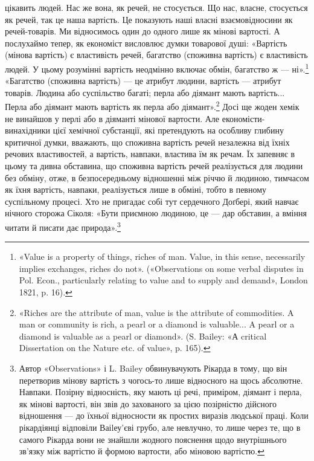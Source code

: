\parcont{}  %
цікавить людей. Нас же вона, як речей, не стосується. Що нас,
власне, стосується як речей, так це наша вартість. Це показують
наші власні взаємовідносини як речей-товарів. Ми відносимось
один до одного лише як мінові вартості. А послухаймо
тепер, як економіст висловлює думки товарової душі: «Вартість
(мінова вартість) є властивість речей, багатство (споживна вартість)
є властивість людей. У цьому розумінні вартість неодмінно
включає обмін, багатство ж — ні».\footnote{
«Value is a property of things, riches of man. Value, in this sense,
necessarily implies exchanges, riches do not». («Observations on some verbal
disputes in Pol. Econ., particularly relating to value and to supply and
demand», London 1821, p. 16).
} «Багатство (споживна вартість) —
це атрибут людини, вартість — атрибут товарів. Людина
або суспільство багаті; перла або діямант мають вартість...
Перла або діямант мають вартість як перла або діямант».\footnote{
«Riches are the attribute of man, value is the attribute of commodities.
A man or community is rich, a pearl or a diamond is valuable...
A pearl or a diamond is valuable as a pearl or diamond». (S. Bailey:
«А critical Dissertation on the Nature etc. of value», p. 165).
}
Досі ще жоден хемік не винайшов у перлі або в діяманті мінової
вартости. Але економісти-винахідники цієї хемічної субстанції,
які претендують на особливу глибину критичної думки, вважають,
що споживна вартість речей незалежна від їхніх речових властивостей,
а вартість, навпаки, властива їм як речам. Їх запевняє
в цьому та дивна обставина, що споживна вартість речей реалізується
для людини без обміну, отже, в безпосередньому відношенні
між річчю й людиною, тимчасом як їхня вартість, навпаки,
реалізується лише в обміні, тобто в певному суспільному процесі.
Хто не пригадає собі тут сердечного Доґбері, який навчає нічного
сторожа Сіколя: «Бути приємною людиною, це — дар обставин,
а вміння читати й писати дає природа».\footnote{
Автор «Observations» і L. Bailey обвинувачують Рікарда в тому,
що він перетворив мінову вартість з чогось-то лише відносного на щось
абсолютне. Навпаки. Позірну відносність, яку мають ці речі, приміром,
діямант і перла, як мінові вартості, він звів до захованого за цією позірністю
дійсного відношення — до їхньої відносности як простих виразів
людської праці. Коли рікардіянці відповіли Ваіlеу’єві грубо, але невлучно,
то лише через те, що в самого Рікарда вони не знайшли жодного
пояснення щодо внутрішнього зв’язку між вартістю й формою вартости,
або міновою вартістю.
}

